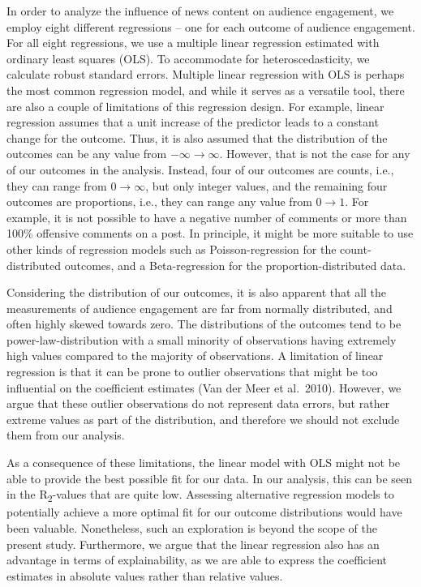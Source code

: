 \documentclass[
]{article}
\begin{document}
\noindent In order to analyze the influence of news content on audience
engagement, we employ eight different regressions -- one for each
outcome of audience engagement. For all eight regressions, we use a
multiple linear regression estimated with ordinary least squares (OLS).
To accommodate for heteroscedasticity, we calculate robust standard
errors. Multiple linear regression with OLS is perhaps the most common
regression model, and while it serves as a versatile tool, there are
also a couple of limitations of this regression design. For example,
linear regression assumes that a unit increase of the predictor leads to
a constant change for the outcome. Thus, it is also assumed that the
distribution of the outcomes can be any value from
\(-\infty \rightarrow \infty\). However, that is not the case for any of
our outcomes in the analysis. Instead, four of our outcomes are counts,
i.e., they can range from \(0 \rightarrow \infty\), but only integer
values, and the remaining four outcomes are proportions, i.e., they can
range any value from \(0 \rightarrow 1\). For example, it is not
possible to have a negative number of comments or more than 100\%
offensive comments on a post. In principle, it might be more suitable to
use other kinds of regression models such as Poisson-regression for the
count-distributed outcomes, and a Beta-regression for the
proportion-distributed data.

Considering the distribution of our outcomes, it is also apparent that
all the measurements of audience engagement are far from normally
distributed, and often highly skewed towards zero. The distributions of
the outcomes tend to be power-law-distribution with a small minority of
observations having extremely high values compared to the majority of
observations. A limitation of linear regression is that it can be prone
to outlier observations that might be too influential on the coefficient
estimates (Van der Meer et al.~2010). However, we argue that these
outlier observations do not represent data errors, but rather extreme
values as part of the distribution, and therefore we should not exclude
them from our analysis.

As a consequence of these limitations, the linear model with OLS might
not be able to provide the best possible fit for our data. In our
analysis, this can be seen in the R\textsubscript{2}-values that are
quite low. Assessing alternative regression models to potentially
achieve a more optimal fit for our outcome distributions would have been
valuable. Nonetheless, such an exploration is beyond the scope of the
present study. Furthermore, we argue that the linear regression also has
an advantage in terms of explainability, as we are able to express the
coefficient estimates in absolute values rather than relative values.
\end{document}
